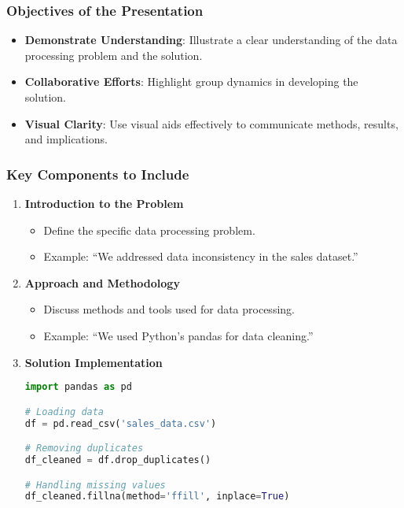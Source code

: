 \documentclass[aspectratio=169]{beamer}
\begin{document}
\begin{frame}[fragile]
    \frametitle{Objectives of the Presentation}
    \begin{itemize}
        \item \textbf{Demonstrate Understanding}: Illustrate a clear understanding of the data processing problem and the solution.
        \item \textbf{Collaborative Efforts}: Highlight group dynamics in developing the solution.
        \item \textbf{Visual Clarity}: Use visual aids effectively to communicate methods, results, and implications.
    \end{itemize}
\end{frame}

\begin{frame}[fragile]
    \frametitle{Key Components to Include}
    \begin{enumerate}
        \item \textbf{Introduction to the Problem}
            \begin{itemize}
                \item Define the specific data processing problem.
                \item Example: “We addressed data inconsistency in the sales dataset.”
            \end{itemize}
        \item \textbf{Approach and Methodology}
            \begin{itemize}
                \item Discuss methods and tools used for data processing.
                \item Example: “We used Python’s pandas for data cleaning.”
            \end{itemize}
        \item \textbf{Solution Implementation}
            \begin{lstlisting}[language=Python]
import pandas as pd

# Loading data
df = pd.read_csv('sales_data.csv')

# Removing duplicates
df_cleaned = df.drop_duplicates()

# Handling missing values
df_cleaned.fillna(method='ffill', inplace=True)
            \end{lstlisting}
    \end{enumerate}
\end{frame}
\end{document}

